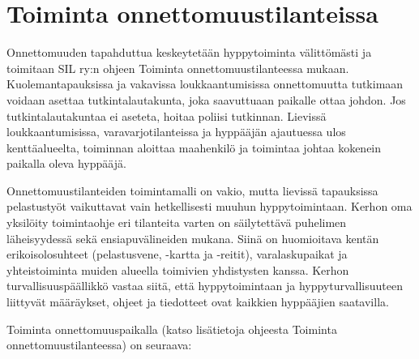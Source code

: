 \section{ Toiminta onnettomuustilanteissa }
\label{riskitekijat-toiminta-onnettomuustilanteessa-ja-ensiapu-toiminta-onnettomuustilanteissa}


Onnettomuuden tapahduttua keskeytetään hyppytoiminta välittömästi ja toimitaan SIL ry:n ohjeen Toiminta onnettomuustilanteessa mukaan. Kuolemantapauksissa ja vakavissa loukkaantumisissa onnettomuutta tutkimaan voidaan asettaa tutkintalautakunta, joka saavuttuaan paikalle ottaa johdon. Jos tutkintalautakuntaa ei aseteta, hoitaa poliisi tutkinnan. Lievissä loukkaantumisissa, varavarjotilanteissa ja hyppääjän ajautuessa ulos kenttäalueelta, toiminnan aloittaa maahenkilö ja toimintaa johtaa kokenein paikalla oleva hyppääjä. 


Onnettomuustilanteiden toimintamalli on vakio, mutta lievissä tapauksissa pelastustyöt vaikuttavat vain hetkellisesti muuhun hyppytoimintaan. Kerhon oma yksilöity toimintaohje eri tilanteita varten on säilytettävä puhelimen läheisyydessä sekä ensiapuvälineiden mukana. Siinä on huomioitava kentän erikoisolosuhteet (pelastusvene, -kartta ja -reitit), varalaskupaikat ja yhteistoiminta muiden alueella toimivien yhdistysten kanssa. Kerhon turvallisuuspäällikkö vastaa siitä, että hyppytoimintaan ja hyppyturvallisuuteen liittyvät määräykset, ohjeet ja tiedotteet ovat kaikkien hyppääjien saatavilla. 


Toiminta onnettomuuspaikalla (katso lisätietoja ohjeesta Toiminta onnettomuustilanteessa) on seuraava: 

